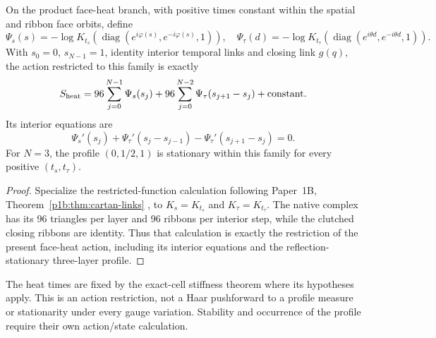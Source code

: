 \documentclass[12pt,a4paper]{article}
\begin{document}
\begin{proposition}
\label{p10:prop:v199-restricted-heat-dynamics}
On the product face-heat branch, with positive times constant within the
spatial and ribbon face orbits, define
\[
 \Psi_s(s)=-\log K_{t_s}(\operatorname{diag}(e^{i\varphi(s)},e^{-i\varphi(s)},1)),
 \quad
 \Psi_\tau(d)=-\log K_{t_\tau}(\operatorname{diag}(e^{i\theta d},e^{-i\theta d},1)).
\]
With \(s_0=0\), \(s_{N-1}=1\), identity interior temporal links and closing
link \(g(q)\), the action restricted to this family is exactly
\begin{equation}
 S_{\rm heat}=96\sum_{j=0}^{N-1}\Psi_s(s_j)
 +96\sum_{j=0}^{N-2}\Psi_\tau(s_{j+1}-s_j)+\text{constant}.
 \label{p10:eq:v199-finite-heat-action}
\end{equation}
Its interior equations are
\[
 \Psi_s'(s_j)+\Psi_\tau'(s_j-s_{j-1})
 -\Psi_\tau'(s_{j+1}-s_j)=0.
\]
For \(N=3\), the profile \((0,1/2,1)\) is stationary within this family
for every positive \((t_s,t_\tau)\).
\end{proposition}
\begin{proof}
Specialize the restricted-function calculation following Paper~1B,
Theorem~\ref{p1b:thm:cartan-links} \cite{Kugelmann2026Paper1B}, to
$K_s=K_{t_s}$ and $K_\tau=K_{t_\tau}$. The native complex has its
96 triangles per layer and 96 ribbons per interior step, while the
clutched closing ribbons are identity. Thus that calculation is exactly
the restriction of the present face-heat action, including its interior
equations and the reflection-stationary three-layer profile.
\end{proof}
The heat times are fixed by the exact-cell stiffness theorem where its
hypotheses apply.  This is an action restriction, not a Haar pushforward to
a profile measure or stationarity under every gauge variation.  Stability
and occurrence of the profile require their own action/state calculation.
\end{document}
